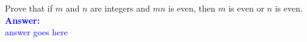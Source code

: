 \item{}
Prove that if $m$ and $n$ are integers and $mn$ is even, then $m$ is even or $n$
is even.\\[12pt]
\ifanswers
\textcolor{blue}{
\textbf{Answer:}\\[6pt]
answer goes here
}
\newpage
\fi
